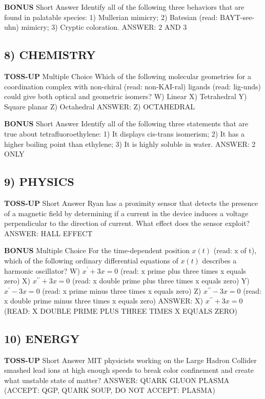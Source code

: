 \documentclass{article}
\begin{document}
\textbf{BONUS}
Short Answer Identify all of the following three behaviors that are found in palatable species: 1) Mullerian mimicry; 2) Batesian (read: BAYT-see-uhn) mimicry; 3) Cryptic coloration.
ANSWER: 2 AND 3

\subsection*{8) CHEMISTRY}
\textbf{TOSS-UP}
Multiple Choice Which of the following molecular geometries for a coordination complex with non-chiral (read: non-KAI-ral) ligands (read: lig-unds) could give both optical and geometric isomers?
W) Linear
X) Tetrahedral
Y) Square planar
Z) Octahedral
ANSWER: Z) OCTAHEDRAL

\textbf{BONUS}
Short Answer Identify all of the following three statements that are true about tetrafluoroethylene: 1) It displays cis-trans isomerism; 2) It has a higher boiling point than ethylene; 3) It is highly soluble in water.
ANSWER: 2 ONLY

\subsection*{9) PHYSICS}
\textbf{TOSS-UP}
Short Answer Ryan has a proximity sensor that detects the presence of a magnetic field by determining if a current in the device induces a voltage perpendicular to the direction of current. What effect does the sensor exploit?
ANSWER: HALL EFFECT

\textbf{BONUS}
Multiple Choice For the time-dependent position $x(t)$ (read: x of t), which of the following ordinary differential equations of $x(t)$ describes a harmonic oscillator?
W) $x^{\prime}+3x=0$ (read: x prime plus three times x equals zero)
X) $x^{\prime\prime}+3x=0$ (read: x double prime plus three times x equals zero)
Y) $x^{\prime}-3x=0$ (read: x prime minus three times x equals zero)
Z) $x^{\prime\prime}-3x=0$ (read: x double prime minus three times x equals zero)
ANSWER: X) $x^{\prime\prime}+3x=0$ (READ: X DOUBLE PRIME PLUS THREE TIMES X EQUALS ZERO)

\subsection*{10) ENERGY}
\textbf{TOSS-UP}
Short Answer MIT physicists working on the Large Hadron Collider smashed lead ions at high enough speeds to break color confinement and create what unstable state of matter?
ANSWER: QUARK GLUON PLASMA (ACCEPT: QGP, QUARK SOUP, DO NOT ACCEPT: PLASMA)
\end{document}
